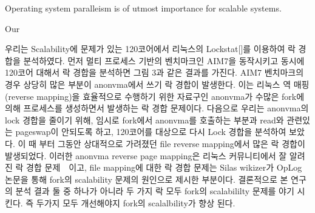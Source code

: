Operating system paralleism is of utmost importance for scalable systems.


Our 





\fi


\ifkor
우리는 Scalability에 문제가 있는 120코어에서 리눅스의 Lockstat[]를 이용하여 락 경합을 분석하였다. 
먼저 멀티 프로세스 기반의 벤치마크인 AIM7을 동작시키고 동시에 120코어 대해서 락 경합을 분석하면 
그림 3과 같은 결과를 가진다. 
AIM7 벤치마크의 경우 상당히 많은 부분이 anonvma에서 쓰기 락 경합이 발생한다. 
이는 리눅스 역 매핑(reverse mapping)을 효율적으로 수행하기 위한 자료구인 anonvma가
수많은 fork에 의해 프로세스를 생성하면서 발생하는 락 경합 문제이다. 
다음으로 우리는 anonvma의 lock 경합을 줄이기 위해, 임시로 fork에서 anonvma를 호출하는 부분과 read와
관련있는 pageswap이 안되도록 하고, 120코어를 대상으로 다시 Lock 경합을 분석하여 보았다.
이 때 부터 그동안 상대적으로 가려졌던 file reverse mapping에서 많은 락 경합이 발생되었다. 
이러한 anonvma reverse page mapping은 리눅스 커뮤니티에서 잘 알려진 락 경합
문제~\cite{Andi2011adding}~\cite{Tim2013adding}이고, file mapping에 대한 락 경합 문제는
Silas wikizer가 OpLog 논문을 통해 fork의 scalability 문제의 원인으로 제시한 부분이다.
결론적으로 본 연구의 분석 결과 둘 중 하나가 아니라 두 가지 락 모두 fork의 scalabililty 문제를 야기 시킨다.
즉 두가지 모두 개선해야지 fork의 scalalbility가 향상 된다. 
\else

